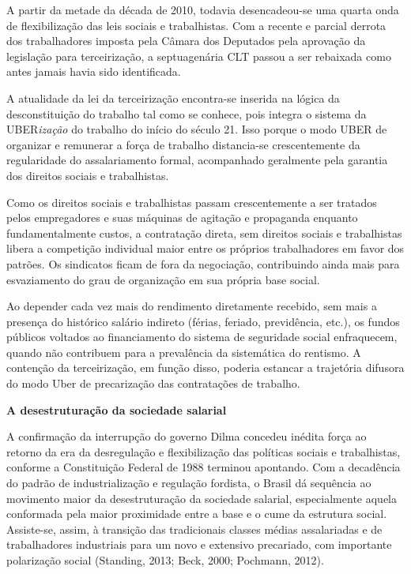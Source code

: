 A partir da metade da década de 2010, todavia desencadeou-se uma quarta
onda de flexibilização das leis sociais e trabalhistas. Com a recente e
parcial derrota dos trabalhadores imposta pela Câmara dos Deputados pela
aprovação da legislação para terceirização, a septuagenária CLT passou a
ser rebaixada como antes jamais havia sido identificada.

A atualidade da lei da terceirização encontra-se inserida na lógica da
desconstituição do trabalho tal como se conhece, pois integra o sistema
da UBER\emph{ização} do trabalho do início do século 21. Isso porque o
modo UBER de organizar e remunerar a força de trabalho distancia-se
crescentemente da regularidade do assalariamento formal, acompanhado
geralmente pela garantia dos direitos sociais e trabalhistas.

Como os direitos sociais e trabalhistas passam crescentemente a ser
tratados pelos empregadores e suas máquinas de agitação e propaganda
enquanto fundamentalmente custos, a contratação direta, sem direitos
sociais e trabalhistas libera a competição individual maior entre os
próprios trabalhadores em favor dos patrões. Os sindicatos ficam de fora
da negociação, contribuindo ainda mais para esvaziamento do grau de
organização em sua própria base social.

Ao depender cada vez mais do rendimento diretamente recebido, sem mais a
presença do histórico salário indireto (férias, feriado, previdência,
etc.), os fundos públicos voltados ao financiamento do sistema de
seguridade social enfraquecem, quando não contribuem para a prevalência
da sistemática do rentismo. A contenção da terceirização, em função
disso, poderia estancar a trajetória difusora do modo Uber de
precarização das contratações de trabalho.

\textbf{A desestruturação da sociedade salarial }

A confirmação da interrupção do governo Dilma concedeu inédita força ao
retorno da era da desregulação e flexibilização das políticas sociais e
trabalhistas, conforme a Constituição Federal de 1988 terminou
apontando. Com a decadência do padrão de industrialização e regulação
fordista, o Brasil dá sequência ao movimento maior da desestruturação da
sociedade salarial, especialmente aquela conformada pela maior
proximidade entre a base e o cume da estrutura social. Assiste-se,
assim, à transição das tradicionais classes médias assalariadas e de
trabalhadores industriais para um novo e extensivo precariado, com
importante polarização social (Standing, 2013; Beck, 2000; Pochmann,
2012).

